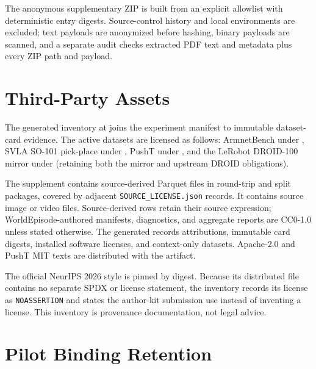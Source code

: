 The anonymous supplementary ZIP is built from an explicit allowlist with deterministic entry
digests. Source-control history and local environments are excluded; text payloads are anonymized
before hashing, binary payloads are scanned, and a separate audit checks extracted PDF text and
metadata plus every ZIP path and payload.

\section{Third-Party Assets}
\label{app:third-party-assets}

The generated inventory at
 joins the experiment manifest to
immutable dataset-card evidence. The \ExpAssetActiveDatasetCount{} active datasets are licensed as
follows: ArmnetBench under \ExpAssetArmnetLicense{}, SVLA SO-101 pick-place under
\ExpAssetSvlaLicense{}, PushT under \ExpAssetPushtLicense{}, and the LeRobot DROID-100 mirror under
\ExpAssetDroidLicense{} (retaining both the mirror and upstream DROID obligations).

The supplement contains \ExpAssetRedistributedParquetCount{} source-derived Parquet files in
round-trip and split packages, covered by \ExpAssetSourceLicenseFileCount{} adjacent
\texttt{SOURCE\_LICENSE.json} records. It contains \ExpAssetSourceMediaCount{} source image or video
files. Source-derived rows retain their source expression; WorldEpisode-authored manifests,
diagnostics, and aggregate reports are CC0-1.0 unless stated otherwise. The generated
 records attributions, immutable card digests, installed software
licenses, and context-only datasets. Apache-2.0 and PushT MIT texts are distributed with the
artifact.

The official NeurIPS 2026 style is pinned by digest. Because its distributed file contains no
separate SPDX or license statement, the inventory records its license as \texttt{NOASSERTION} and
states the author-kit submission use instead of inventing a license. This inventory is provenance
documentation, not legal advice.

\section{Pilot Binding Retention}

